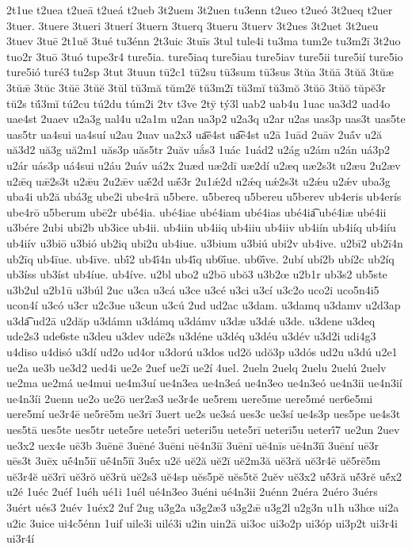 {2t1ue
t2uea
t2ueā
t2ueá
t2ueb
3t2uem
3t2uen
tu3enn
t2ueo
t2ueó
3t2ueq
t2uer
3tuer.
3tuere
3tueri
3tuerí
3tuern
3tuerq
3tueru
3tuerv
3t2ues
3t2uet
3t2ueu
3tuev
3tuē
2t1uĕ
3tué
tu3énn
2t3uic
3tuīs
3tul
tule4i
tu3ma
tum2e
tu3m2ī
3t2uo
tuo2r
3tuō
3tuó
tupe3r4
ture5ia.
ture5iaq
ture5iau
ture5iav
ture5ii
ture5ií
ture5io
ture5ió
turé3
tu2sp
3tut
3tuun
tū2c1
tū2su
tū3sum
tū3sus
3tŭa
3tŭā
3tŭă
3tŭæ
3tŭǣ
3tŭc
3tŭē
3tŭĕ
3tŭl
tŭ3mă
tŭm2ĕ
tŭ3m2ī
tŭ3mĭ
tŭ3mŏ
3tŭō
3tŭŏ
tŭpĕ3r
tŭ2s
tŭ́3mĭ
tú2cu
tú2du
túm2i
2tv
t3ve
2tȳ
tý3l
uab2
uab4u
1uac
ua3d2
uad4o
uae4st
2uaev
u2a3g
ual4u
u2a1m
u2an
ua3p2
u2a3q
u2ar
u2as
uas3p
uas3t
uas5te
uas5tr
ua4sui
ua4suí
u2au
2uav
ua2x3
ua͞e4st
ua͡e4st
u2ā
1uād
2uāv
2uā́v
u2ă
uă3d2
uă3g
uă2m1
uăs3p
uăs5tr
2uăv
uắs3
1uác
1uád2
u2ág
u2ám
u2án
uá3p2
u2ár
uás3p
uá4sui
u2áu
2uáv
uá2x
2uæd
uæ2dī
uæ2dí
u2æq
uæ2s3t
u2æu
2u2æv
u2ǣq
uǣ2s3t
u2ǣu
2u2ǣv
uǣ́2d
uǣ́3r
2u1ǽ2d
u2ǽq
uǽ2s3t
u2ǽu
u2ǽv
uba3g
uba4i
ub2ă
ubá3g
ube2i
ube4rā
u5bere.
u5bereq
u5bereu
u5berev
ub4eris
ub4erís
ube4rō
u5berum
ubē2r
ubé4ia.
ubé4iae
ubé4iam
ubé4ias
ubé4ia͡
ubé4iæ
ubé4ii
u3bére
2ubi
ubi2b
ub3ice
ub4ii.
ub4iin
ub4iiq
ub4iiu
ub4iiv
ub4iín
ub4iíq
ub4iíu
ub4iív
u3biō
u3bió
ub2iq
ubi2u
ub4iue.
u3bium
u3biú
ubi2v
ub4ive.
u2bī2
ub2ī4n
ub2īq
ub4īue.
ub4īve.
ubī́2
ub4ī́4n
ub4ī́q
ub6ī́ue.
ub6ī́ve.
2ubí
ubí2b
ubí2c
ub2íq
ub3íss
ub3íst
ub4íue.
ub4íve.
u2bl
ubo2
u2bō
ubŏ3
u3b2œ
u2b1r
ub3s2
ub5ste
u3b2ul
u2b1ū
u3búl
2uc
u3ca
u3cá
u3ce
u3cé
u3ci
u3cí
u3c2o
uco2i
uco5n4i5
ucon4í
u3có
u3cr
u2c3ue
u3cun
u3cú
2ud
ud2ac
u3dam.
u3damq
u3damv
u2d3ap
u3da͡
ud2ā
u2dăp
u3dámn
u3dámq
u3dámv
u3dæ
u3dǽ
u3de.
u3dene
u3deq
ude2s3
ude6ste
u3deu
u3dev
udē2s
u3déne
u3déq
u3déu
u3dév
u3d2i
udi4g3
u4diso
u4disó
u3dí
ud2o
ud4or
u3dorú
u3dos
ud2ŏ
udŏ3p
u3dós
ud2u
u3dú
u2e1
ue2a
ue3b
ue3d2
ued4i
ue2e
2uef
ue2ī
ue2í
4uel.
2ueln
2uelq
2uelu
2uelú
2uelv
ue2ma
ue2má
ue4mui
ue4m3uí
ue4n3ea
ue4n3eá
ue4n3eo
ue4n3eó
ue4n3ii
ue4n3ií
ue4n3íi
2uenn
ue2o
ue2ō
uer2æ3
ue3r4e
ue5rem
uere5me
uere5mé
uer6e5mi
uere5mí
ue3r4ē
ue5rē5m
ue3rī
3uert
ue2s
ue3sá
ues3c
ue3sí
ue4s3p
ues5pe
ue4s3t
ues5tā
ues5te
ues5tr
uete5re
uete5ri
ueteri5u
uete5rī
ueterī5u
ueterī́7
ue2un
2uev
ue3x2
uex4e
uē3b
3uēnē
3uēné
3uēni
uē4n3iī
3uēnī
uē4nīs
uē4n3ĭī
3uēní
uē3r
uēs3t
3uēx
uḗ4n5iī
uḗ4n5ĭī
3uḗx
u2ĕ
uĕ2ă
uĕ2ĭ
uĕ2m3ă
uĕ3ră
uĕ3r4ē
uĕ5rē5m
uĕ3r4ĕ
uĕ3rī
uĕ3rŏ
uĕ3rŭ
uĕ2s3
uĕ4sp
uĕs5pĕ
uĕs5tĕ
2uĕv
uĕ3x2
uĕ́3ră
uĕ́3rĕ
uĕ́x2
u2é
1uéc
2uéf
1uéh
ué1i
1uél
ué4n3eo
3uéni
ué4n3ii
2uénn
2uéra
2uéro
3uérs
3uért
ués3
2uév
1uéx2
2uf
2ug
u3g2a
u3g2æ3
u3g2ǣ
u3g2l
u2g3n
u1h
u3hœ
ui2a
u2ic
3uice
ui4c5énn
1uif
uile3i
uilé3i
u2in
uin2ā
ui3oc
ui3o2p
ui3óp
ui3p2t
ui3r4i
ui3r4í
}
